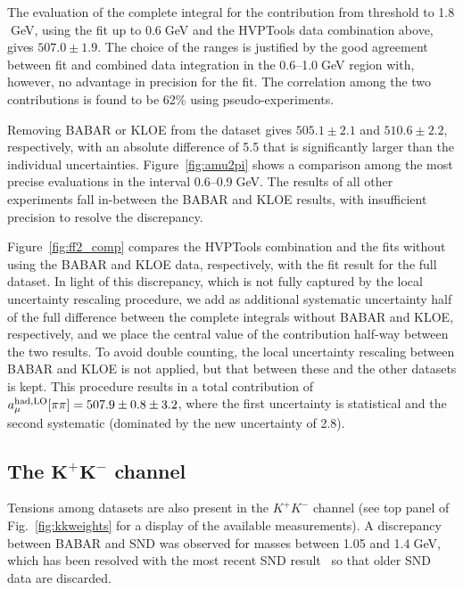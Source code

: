 The evaluation of the complete \amuhadLOpp integral for the \pp contribution from threshold to 1.8$\;$GeV, using the fit up to 0.6$\;$GeV and the HVPTools data combination above, gives $507.0\pm1.9$. The choice of the ranges is justified by the good agreement between fit and combined data integration in the 0.6--1.0$\;$GeV region with, however, no advantage in precision for the fit. The correlation among the two contributions is found to be 62\% using pseudo-experiments.

Removing BABAR or KLOE from the dataset gives $505.1\pm2.1$ and $510.6\pm2.2$, respectively, with an absolute difference of 5.5 that is significantly larger than the individual uncertainties. Figure~\ref{fig:amu2pi} shows a comparison among the most precise \amuhadLOpp evaluations in the interval 0.6--0.9$\;$GeV. The results of all other experiments fall in-between the BABAR and KLOE results, with insufficient precision to resolve the discrepancy. 

Figure~\ref{fig:ff2_comp} compares the HVPTools combination and the fits without using the BABAR  and KLOE data, respectively, with the fit result for the full dataset. In light of this discrepancy, which is not fully captured by the local uncertainty rescaling procedure, we add as additional systematic uncertainty half of the full difference between the complete integrals without BABAR and KLOE, respectively, and we place the central value of the \amuhadLOpp contribution half-way between the two results. To avoid double counting, the local uncertainty rescaling between BABAR and KLOE is not applied, but that between these and the other \pp datasets is kept.
This procedure results in a total \pp contribution of  $a_\mu^{\rm had,LO}[\pi\pi]=507.9\pm0.8\pm3.2$, where the first uncertainty is statistical and the second systematic (dominated by the new uncertainty of 2.8).

\subsection{The \sansmath$\mathbf{\boldsymbol{K^+K^-}}$ channel}

Tensions among datasets are also present in the $K^+K^-$ channel (see top panel of Fig.~\ref{fig:kkweights} for a display of the available measurements). A discrepancy between BABAR and SND was observed for masses between 1.05 and 1.4$\;$GeV, which has been resolved with the most recent SND result~\cite{snd-kpkm} so that older SND data are discarded. 

